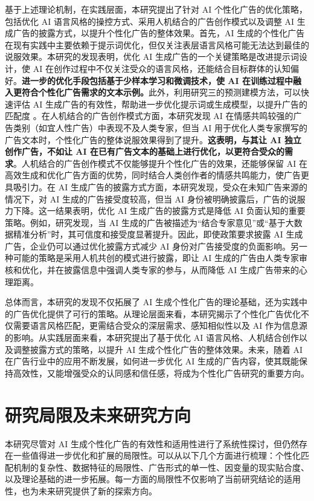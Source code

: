 基于上述理论机制，在实践层面，本研究提出了针对 AI 个性化广告的优化策略，包括优化 AI 语言风格的操控方式、采用人机结合的广告创作模式以及调整 AI 生成广告的披露方式，以提升个性化广告的整体效果。首先，AI 生成的个性化广告在现有实践中主要依赖于提示词优化，但仅关注表层语言风格可能无法达到最佳的说服效果。本研究的发现表明，优化 AI 生成广告的一个关键策略是改进提示词设计，使 AI 在创作过程中不仅关注受众的语言风格，还能结合目标群体的认知偏好。\textbf{进一步的优化手段包括基于少样本学习和微调技术，使 AI 在训练过程中融入更符合个性化广告需求的文本示例。}此外，利用研究三的预测建模方法，可以快速评估 AI 生成广告的有效性，帮助进一步优化提示词或生成模型，以提升广告的匹配度 \citep{raut2023reinforcing}。在人机结合的广告创作模式方面，本研究发现 AI 在情感共鸣较强的广告类别（如宜人性广告）中表现不及人类专家，但当 AI 用于优化人类专家撰写的广告文本时，个性化广告的整体说服效果得到了提升。\textbf{这表明，与其让 AI 独立创作广告，不如让 AI 在已有广告文本的基础上进行优化，以更符合受众的需求}。人机结合的广告创作模式不仅能够提升个性化广告的效果，还能够保留 AI 在高效生成和优化广告方面的优势，同时结合人类创作者的情感共鸣能力，使广告更具吸引力。在 AI 生成广告的披露方式方面，本研究发现，受众在未知广告来源的情况下，对 AI 生成的广告接受度较高，但当 AI 身份被明确披露后，广告的说服力下降。这一结果表明，优化 AI 生成广告的披露方式是降低 AI 负面认知的重要策略。例如，研究发现，当 AI 生成的广告被描述为“结合专家意见”或“基于大数据精准分析”时，其可信度和接受度显著提升。因此，即使政策要求披露 AI 生成广告，企业仍可以通过优化披露方式减少 AI 身份对广告接受度的负面影响。另一种可能的策略是采用人机共创的模式进行披露，即让 AI 生成的广告由人类专家审核和优化，并在披露信息中强调人类专家的参与，从而降低 AI 生成广告带来的心理距离。

总体而言，本研究的发现不仅拓展了 AI 生成个性化广告的理论基础，还为实践中的广告优化提供了可行的策略。从理论层面来看，本研究揭示了个性化广告优化不仅需要语言风格匹配，更需结合受众的深层需求、感知相似性以及 AI 作为信息源的影响。从实践层面来看，本研究提出了基于优化 AI 语言风格、人机结合创作以及调整披露方式的策略，以提升 AI 生成个性化广告的整体效果。未来，随着 AI 在广告行业中的应用不断发展，如何进一步优化 AI 生成的广告内容，使其既能保持高效性，又能增强受众的认同感和信任感，将成为个性化广告研究的重要方向。

\section{研究局限及未来研究方向}

本研究尽管对 AI 生成个性化广告的有效性和适用性进行了系统性探讨，但仍然存在一些值得进一步优化和扩展的局限性。可以从以下几个方面进行梳理：个性化匹配机制的复杂性、数据特征的局限性、广告形式的单一性、因变量的现实贴合度、以及理论基础的进一步拓展。每一方面的局限性不仅影响了当前研究结论的适用性，也为未来研究提供了新的探索方向。

